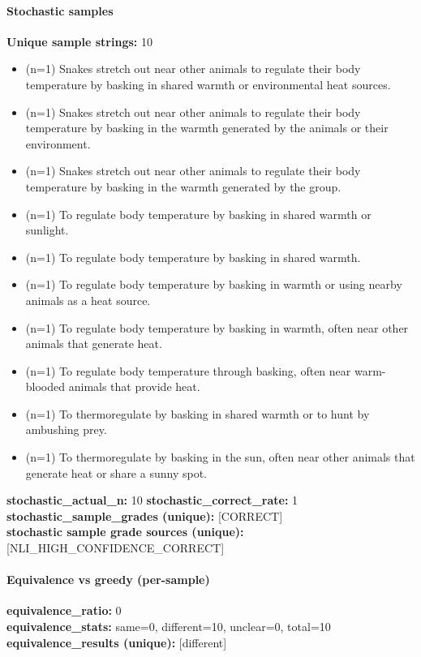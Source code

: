 \documentclass[11pt]{article}
\begin{document}
\paragraph{Stochastic samples}
\textbf{Unique sample strings:} 10\\
\small
\begin{itemize}
\item (n=1) Snakes stretch out near other animals to regulate their body temperature by basking in shared warmth or environmental heat sources.
\item (n=1) Snakes stretch out near other animals to regulate their body temperature by basking in the warmth generated by the animals or their environment.
\item (n=1) Snakes stretch out near other animals to regulate their body temperature by basking in the warmth generated by the group.
\item (n=1) To regulate body temperature by basking in shared warmth or sunlight.
\item (n=1) To regulate body temperature by basking in shared warmth.
\item (n=1) To regulate body temperature by basking in warmth or using nearby animals as a heat source.
\item (n=1) To regulate body temperature by basking in warmth, often near other animals that generate heat.
\item (n=1) To regulate body temperature through basking, often near warm-blooded animals that provide heat.
\item (n=1) To thermoregulate by basking in shared warmth or to hunt by ambushing prey.
\item (n=1) To thermoregulate by basking in the sun, often near other animals that generate heat or share a sunny spot.
\end{itemize}
\normalsize
\textbf{stochastic\_actual\_n:} 10 \quad \textbf{stochastic\_correct\_rate:} 1\\
\textbf{stochastic\_sample\_grades (unique):} [CORRECT]\\
\textbf{stochastic sample grade sources (unique):} [NLI\_HIGH\_CONFIDENCE\_CORRECT]\\
\paragraph{Equivalence vs greedy (per-sample)}
\textbf{equivalence\_ratio:} 0\\
\textbf{equivalence\_stats:} same=0, different=10, unclear=0, total=10\\
\textbf{equivalence\_results (unique):} [different]\\
\end{document}
